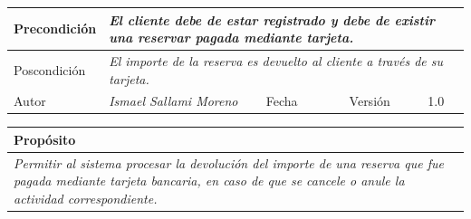 \begin{table}[H]
\begin{tabular}{llllllll}
    \multicolumn{1}{|l|}{Precondición}                           & \multicolumn{7}{p{10cm}|}{{\color[HTML]{808080} \textit{El cliente debe de estar registrado y debe de existir una reservar pagada mediante tarjeta.}}}                                                                                                                                                                                                                                   \\ \hline
    \multicolumn{1}{|l|}{Poscondición}                           & \multicolumn{7}{l|}{{\color[HTML]{808080} \textit{El importe de la reserva es devuelto al cliente a través de su tarjeta.}}}                                                                                                                                                                                                                                                       \\ \hline
    \multicolumn{1}{|l|}{Autor}                                  & \multicolumn{1}{l|}{{\color[HTML]{808080} \textit{Ismael Sallami Moreno}}}                           & \multicolumn{2}{l|}{Fecha}                                                   & \multicolumn{1}{l|}{}                          & \multicolumn{2}{l|}{Versión}                                                      & \multicolumn{1}{l|}{1.0}                                                     \\ \hline
    \end{tabular}
    \end{table}

    \begin{table}[H]
        \begin{tabular}{llllllll}
    \hline
    \multicolumn{8}{|l|}{\cellcolor[HTML]{F2F2F2}Propósito}                                                                                                                                                                                                                                                                                                                                                                                           \\ \hline
    \multicolumn{8}{|p{15cm}|}{{\color[HTML]{808080} \textit{Permitir al sistema procesar la devolución del importe de una reserva que fue pagada mediante tarjeta bancaria, en caso de que se cancele o anule la actividad correspondiente.}}}                                                                                                                                                                                                             \\ \hline
    \end{tabular}
    \end{table}


